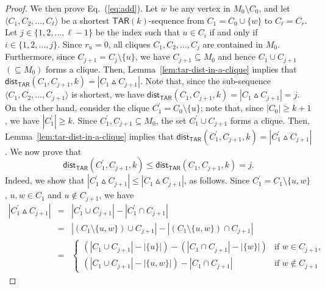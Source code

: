 \documentclass{llncs}
\newcommand{\TAR}[1]{\mathsf{TAR}(#1)}
\newcommand{\symdiff}[2]{#1 \vartriangle #2}
\newcommand{\ini}{0}
\newcommand{\tar}{r}
\newcommand{\cliq}{C}
\newcommand{\distTAR}[3]{\mathsf{dist_{TAR}}(#1,#2,#3)}
\newcounter{one}
\begin{document}
\begin{proof}
 	We then prove Eq.~(\ref{eq:add}). 
	Let $w$ be any vertex in $M_{0} \setminus \cliq_{\ini}$, and let $\langle \cliq_{1}, \cliq_2, \ldots, \cliq_{\ell} \rangle$ be a shortest $\TAR{k}$-sequence from $\cliq_{1} = \cliq_{\ini} \cup \{w\}$ to  $\cliq_{\ell} = \cliq_{\tar}$.
	Let $j \in \{1,2,\ldots, \ell-1\}$ be the index such that $u \in \cliq_{i}$ if and only if $i \in \{1,2, \ldots, j\}$.
	Since $r_{u} = 0$, all cliques $\cliq_1, \cliq_2, \ldots, \cliq_j$ are contained in $M_0$. 
	Furthermore, since $\cliq_{j+1} = \cliq_{j} \setminus \{u\}$, we have $\cliq_{j+1} \subseteq M_0$ and hence $\cliq_{1} \cup \cliq_{j+1}$ $(\subseteq M_{0})$ forms a clique.
	Then, Lemma~\ref{lem:tar-dist-in-a-clique} implies that $\distTAR{\cliq_{1}}{\cliq_{j+1}}{k} = |\symdiff{\cliq_{1}}{\cliq_{j+1}}|$.
	Note that, since the sub-sequence $\langle \cliq_1, \cliq_2, \ldots, \cliq_{j+1} \rangle$ is shortest, we have $\distTAR{\cliq_{1}}{\cliq_{j+1}}{k} = |\symdiff{\cliq_{1}}{\cliq_{j+1}}| = j$.
	On the other hand, consider the clique $\cliq_{1}^\prime = \cliq_\ini \setminus \{u\}$;
note that, since $|\cliq_{\ini}| \ge k+1$, we have $|\cliq_{1}^\prime| \ge k$. 
	Since $\cliq_1^\prime, \cliq_{j+1} \subseteq M_0$, the set $\cliq_{1}^\prime \cup \cliq_{j+1}$ forms a clique.
	Then, Lemma~\ref{lem:tar-dist-in-a-clique} implies that $\distTAR{\cliq_{1}^\prime}{\cliq_{j+1}}{k} = |\symdiff{\cliq_{1}^\prime}{\cliq_{j+1}}|$.
	We now prove that 
	\begin{equation} \label{eq:add-one}
		\distTAR{\cliq_{1}^\prime}{\cliq_{j+1}}{k} \le \distTAR{\cliq_{1}}{\cliq_{j+1}}{k} = j.
	\end{equation}
	Indeed, we show that $|\symdiff{\cliq_{1}^\prime}{\cliq_{j+1}}| \le |\symdiff{\cliq_{1}}{\cliq_{j+1}}|$, as follows.
	Since $\cliq_{1}^\prime = \cliq_{1} \setminus \{u,w\}$, $u, w \in \cliq_{1}$ and $u \notin \cliq_{j+1}$, we have 
	\begin{eqnarray*}
		|\symdiff{\cliq_{1}^\prime}{\cliq_{j+1}}| &=& |\cliq_{1}^\prime \cup \cliq_{j+1}| - |\cliq_{1}^\prime \cap \cliq_{j+1}| \\
				&=& |(\cliq_{1} \setminus \{u,w\}) \cup \cliq_{j+1}| - |(\cliq_{1} \setminus \{u,w\}) \cap \cliq_{j+1}| \\
				&=& \begin{cases}
						(|\cliq_{1}  \cup \cliq_{j+1}| - |\{u\}|) - (|\cliq_{1} \cap \cliq_{j+1}| - |\{w\}|) & \text{if } w \in \cliq_{j+1}, \\
						(|\cliq_{1} \cup \cliq_{j+1}| - |\{u,w\}|) - |\cliq_{1} \cap \cliq_{j+1}| & \text{if } w \notin \cliq_{j+1}

\end{cases}
\end{eqnarray*}
\end{proof}
\end{document}
